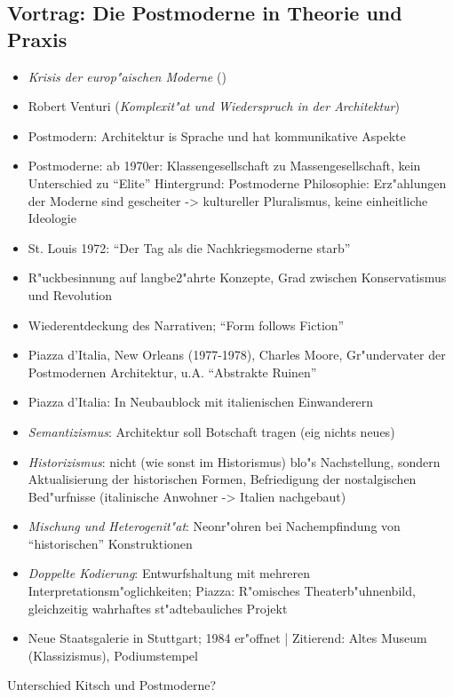 \documentclass[emulatestandardclasses]{scrartcl}
\begin{document}
\subsection{Vortrag: Die Postmoderne in Theorie und Praxis}

\begin{itemize}
  \item \emph{Krisis der europ"aischen Moderne} ()
  \item Robert Venturi (\emph{Komplexit"at und Wiederspruch in der Architektur})
  \item Postmodern: Architektur is Sprache und hat kommunikative Aspekte
  \item Postmoderne: ab 1970er: Klassengesellschaft zu Massengesellschaft, kein Unterschied zu "`Elite"' Hintergrund: Postmoderne Philosophie: Erz"ahlungen der Moderne sind gescheiter -> kultureller Pluralismus, keine einheitliche Ideologie
  \item St. Louis 1972: "`Der Tag als die Nachkriegsmoderne starb"'	
  \item R"uckbesinnung auf langbe2"ahrte Konzepte, Grad zwischen Konservatismus und Revolution
  \item Wiederentdeckung des Narrativen; "`Form follows Fiction"'
  \item Piazza d'Italia, New Orleans (1977-1978), Charles Moore, Gr"undervater der Postmodernen Architektur, u.A. "`Abstrakte Ruinen"'
  \item Piazza d'Italia: In Neubaublock mit italienischen Einwanderern 
  \item \emph{Semantizismus}: Architektur soll Botschaft tragen (eig nichts neues)
  \item \emph{Historizismus}: nicht (wie sonst im Historismus) blo"s Nachstellung, sondern Aktualisierung der historischen Formen, Befriedigung der nostalgischen Bed"urfnisse (italinische Anwohner -> Italien nachgebaut)
  \item \emph{Mischung und Heterogenit"at}: Neonr"ohren bei Nachempfindung von "`historischen"' Konstruktionen
  \item \emph{Doppelte Kodierung}: Entwurfshaltung mit mehreren Interpretationsm"oglichkeiten; Piazza: R"omisches Theaterb"uhnenbild, gleichzeitig wahrhaftes st"adtebauliches Projekt
  \item Neue Staatsgalerie in Stuttgart; 1984 er"offnet | Zitierend: Altes Museum (Klassizismus), Podiumstempel
\end{itemize}


Unterschied Kitsch und Postmoderne?
\end{document}
